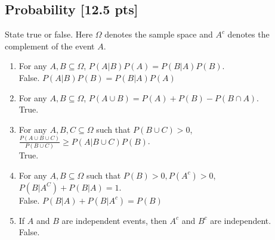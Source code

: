 \documentclass[a4paper]{article}
\theoremstyle{definition}
\newenvironment{soln}{
	\leavevmode\color{blue}\ignorespaces
}{}
\begin{document}
	\subsection{Probability [12.5 pts]}
	State true or false. Here $\Omega$ denotes the sample space and $A^c$ denotes the complement of the event $A$.
	\begin{enumerate}
		\item For any $A, B \subseteq \Omega$, $P(A|B)P(A) = P(B|A)P(B)$.\\
		\begin{soln} False. $P(A|B)P(B) = P(B|A)P(A)$ \end{soln}
		
		\item For any $A, B \subseteq \Omega$, $P(A \cup B) = P(A) + P(B) - P(B \cap A)$.\\         
		\begin{soln}  True. \end{soln}
		
		\item For any $A, B, C \subseteq \Omega$ such that $P(B \cup C) > 0$,
		$\frac{P(A \cup B \cup C)}{P(B \cup C)} \geq P(A | B \cup C) P(B)$.\\ 
		\begin{soln}  True. \end{soln}
		
		\item For any $A, B\subseteq\Omega$ such that $P(B) > 0, P(A^c) > 0$,
		$P(B|A^C) + P(B|A) = 1$.\\ 
		\begin{soln}  False. $P(B|A)+P(B|A^c)=P(B)$ \end{soln}
		
		\item If $A$ and $B$ are independent events, then $A^{c}$ and $B^{c}$ are independent.\\
		\begin{soln}  False. \end{soln}
		
	\end{enumerate}
	
\end{document}
